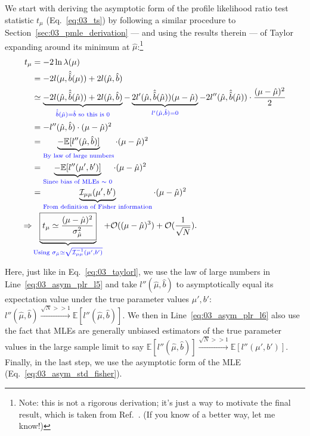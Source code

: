 We start with deriving the asymptotic form of the profile likelihood ratio test statistic $t_\mu$ (Eq.~\ref{eq:03_ts}) by following a similar procedure to Section~\ref{sec:03_pmle_derivation} --- and using the results therein --- of Taylor expanding around its minimum at $\hat\mu$:\footnote{Note: this is not a rigorous derivation; it's just a way to motivate the final result, which is taken from Ref.~\cite{Cowan:2010js}.
(If you know of a better way, let me know!)}
\begin{align}
    t_\mu &= -2\ln\lambda(\mu) \\
         &= -2l(\mu, \hat{\hat{b}}(\mu)) + 2l(\hat\mu, \hat{b}) \\
         &\simeq
        \underbrace{-2l(\hat\mu, \hat{\hat{b}}(\hat\mu)) + 2l(\hat\mu, \hat{b})}_{\textcolor{blue}{\hat{\hat{b}}(\hat\mu)=\hat b \text{ so this is 0}}} -
        \underbrace{2l'(\hat\mu, \hat{\hat{b}}(\hat\mu))(\mu-\hat\mu)}_{\textcolor{blue}{l'(\hat\mu, \hat b) = 0}} - 2l''(\hat\mu, \hat{\hat{b}}(\hat\mu))\cdot\frac{(\mu-\hat\mu)^2}{2} \\
        &= -l''(\hat\mu, \hat b) \cdot (\mu-\hat\mu)^2 \\
        &= \underbrace{-\mathbb E[l''(\hat\mu, \hat b)]}_{\textcolor{blue}{\text{By law of large numbers}}} \cdot (\mu-\hat\mu)^2 \label{eq:03_asym_plr_l5} \\
        &= \underbrace{-\mathbb E[l''(\mu', b')]}_{\textcolor{blue}{\text{Since bias of MLEs $\sim$ 0}}} \cdot (\mu-\hat\mu)^2 \label{eq:03_asym_plr_l6} \\
        &= \underbrace{\mathcal I_{\mu\mu}(\mu', b')}_{\textcolor{blue}{\text{From definition of Fisher information}}} \cdot (\mu-\hat\mu)^2 \\
 \Rightarrow  & \underbrace{\boxed{t_\mu \simeq \frac{(\mu-\hat\mu)^2}{\sigma_{\hat\mu}^2}}}_{\textcolor{blue}{\text{Using } \sigma_{\hat\mu} \simeq \sqrt{\mathcal I^{-1}_{\mu\mu}(\mu', b')}}} + \mathcal O((\mu-\hat\mu)^3) + \mathcal O(\frac{1}{\sqrt N}).
\label{eq:03_plr_taylor}
\end{align}

Here, just like in Eq.~\ref{eq:03_taylorl}, we use the law of large numbers in Line~\ref{eq:03_asym_plr_l5} and take $l''(\hat\mu, \hat b)$ to asymptotically equal its expectation value under the true parameter values $\mu', b'$: $l''(\hat\mu, \hat b) \xrightarrow{\sqrt{N} >> 1} \mathbb E[l''(\hat\mu, \hat b)]$.
We then in Line~\ref{eq:03_asym_plr_l6} also use the fact that MLEs are generally unbiased estimators of the true parameter values in the large sample limit to say $\mathbb E[l''(\hat\mu, \hat b)] \xrightarrow{\sqrt{N} >> 1} \mathbb E[l''(\mu', b')]$.
Finally, in the last step, we use the asymptotic form of the MLE (Eq.~\ref{eq:03_asym_std_fisher}).


